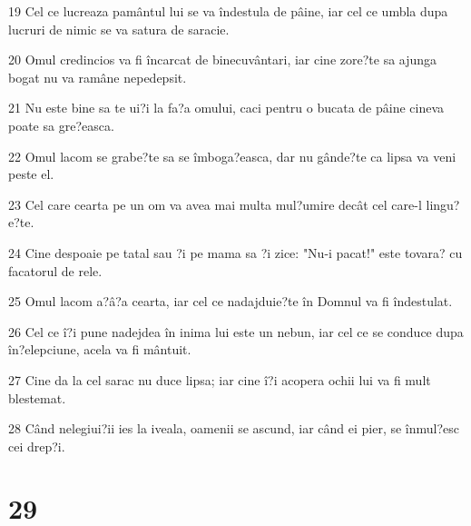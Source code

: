 \par 19 Cel ce lucreaza pamântul lui se va îndestula de pâine, iar cel ce umbla dupa lucruri de nimic se va satura de saracie.
\par 20 Omul credincios va fi încarcat de binecuvântari, iar cine zore?te sa ajunga bogat nu va ramâne nepedepsit.
\par 21 Nu este bine sa te ui?i la fa?a omului, caci pentru o bucata de pâine cineva poate sa gre?easca.
\par 22 Omul lacom se grabe?te sa se îmboga?easca, dar nu gânde?te ca lipsa va veni peste el.
\par 23 Cel care cearta pe un om va avea mai multa mul?umire decât cel care-l lingu?e?te.
\par 24 Cine despoaie pe tatal sau ?i pe mama sa ?i zice: "Nu-i pacat!" este tovara? cu facatorul de rele.
\par 25 Omul lacom a?â?a cearta, iar cel ce nadajduie?te în Domnul va fi îndestulat.
\par 26 Cel ce î?i pune nadejdea în inima lui este un nebun, iar cel ce se conduce dupa în?elepciune, acela va fi mântuit.
\par 27 Cine da la cel sarac nu duce lipsa; iar cine î?i acopera ochii lui va fi mult blestemat.
\par 28 Când nelegiui?ii ies la iveala, oamenii se ascund, iar când ei pier, se înmul?esc cei drep?i.

\chapter{29}

